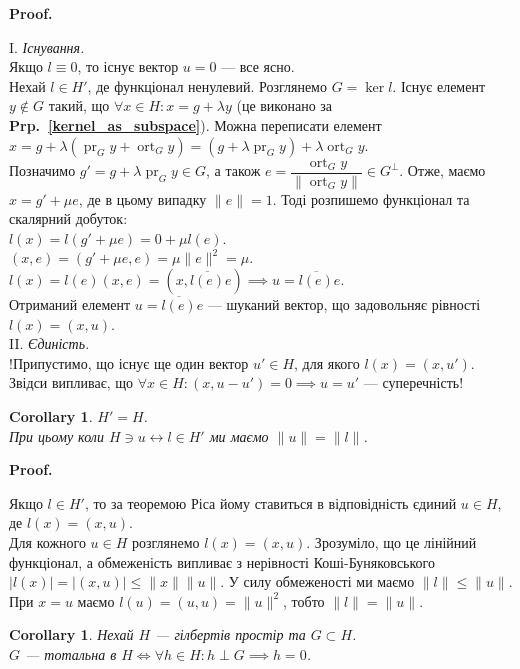 \documentclass[a4paper, 10pt]{article}
\makeatletter
\theoremstyle{theoremdd}
\theoremstyle{theoremdd}
\theoremstyle{theoremdd}
\theoremstyle{theoremdd}
\theoremstyle{theoremdd}
\theoremstyle{theoremdd}
\theoremstyle{theoremdd}
\theoremstyle{theoremdd}
\newtheorem{corollary}[theorem]{Corollary}
\newcommand\prpref[1]{\textbf{Prp.~\ref{#1}}}
\DeclareMathOperator{\ort}{ort}
\DeclareMathOperator{\pr}{pr}
\renewenvironment{proof}[1][Proof.\\]{\par
\pushQED{\hfill \qed}%
\normalfont \topsep6\p@\@plus6\p@\relax
\trivlist
\item\relax
{\bfseries
#1\@addpunct{.}}\hspace\labelsep\ignorespaces
}{%
\popQED\endtrivlist\@endpefalse
}
\makeatother
\begin{document}
\begin{proof}
I. \textit{Існування.}\\
Якщо $l \equiv 0$, то існує вектор $u = 0$ --- все ясно.\\
Нехай $l \in H'$, де функціонал ненулевий. Розглянемо $G = \ker l$. Існує елемент $y \notin G$ такий, що $\forall x \in H: x = g + \lambda y$ (це виконано за \prpref{kernel_as_subspace}). Можна переписати елемент \\
$x = g + \lambda (\pr_G y + \ort_G y) = (g + \lambda \pr_G y) + \lambda \ort_G y$.\\
Позначимо $g' = g + \lambda \pr_G y \in G$, а також $e = \dfrac{\ort_G y}{\|\ort_G y\|} \in G^\perp$. Отже, маємо $x = g' + \mu e$, де в цьому випадку $\|e\| = 1$. Тоді розпишемо функціонал та скалярний добуток:\\
$l(x) = l(g'+\mu e) = 0 + \mu l(e)$.\\
$(x,e) = (g'+\mu e,e) = \mu \|e\|^2 = \mu$.\\
$l(x) = l(e)(x,e) = (x,\overline{l(e)}e) \implies u = \overline{l(e)}e$.\\
Отриманий елемент $u = \overline{l(e)}e$ --- шуканий вектор, що задовольняє рівності $l(x) = (x,u)$.
\bigskip \\
II. \textit{Єдиність.}\\
!Припустимо, що існує ще один вектор $u' \in H$, для якого $l(x) = (x,u')$. Звідси випливає, що $\forall x \in H: (x,u-u') = 0 \implies u = u'$ --- суперечність!
\end{proof}

\begin{corollary}
$H' = H$.\\
При цьому коли $H \ni u \leftrightarrow l \in H'$ ми маємо $\|u\| = \|l\|$.
\end{corollary}

\begin{proof}
Якщо $l \in H'$, то за теоремою Ріса йому ставиться в відповідність єдиний $u \in H$, де $l(x) = (x,u)$.\\
Для кожного $u \in H$ розглянемо $l(x) = (x,u)$. Зрозуміло, що це лінійний функціонал, а обмеженість випливає з нерівності Коші-Буняковського $|l(x)| = |(x,u)| \leq \|x\| \|u\|$. У силу обмеженості ми маємо $\|l\| \leq \|u\|$. При $x = u$ маємо $l(u) = (u,u) = \|u\|^2$, тобто $\|l\| = \|u\|$.
\end{proof}

\begin{corollary}
Нехай $H$ --- гілбертів простір та $G \subset H$.\\
$G$ --- тотальна в $H \iff \forall h \in H: h \perp G \implies h = 0$.
\end{corollary}
\end{document}
